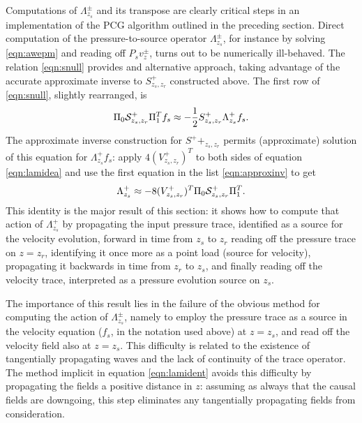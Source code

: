 Computations of $\Lambda^{\pm}_{z_s}$ and its transpose are clearly critical steps in an
implementation of the PCG algorithm outlined in the preceding section.
Direct computation of the pressure-to-source operator $\Lambda^{\pm}_{z_s}$, for instance by solving
\ref{eqn:awepm} and reading off $P_sv^{\pm}_{z}$, turns out to be
numerically ill-behaved. The relation \ref{eqn:snull} provides and
alternative approach, taking advantage of the accurate approximate
inverse to $S^+_{z_s,z_r}$ constructed above. The first row of
\ref{eqn:snull}, slightly rearranged, is
\begin{equation}
  \label{eqn:lamidea}
  \Pi_0{\cal S}^+_{z_s,z_r}\Pi_1^T f_s \approx  -\frac{1}{2} S^+_{z_s,z_r}\Lambda^+_{z_s}f_s.
\end{equation}
The approximate inverse construction for $S^++_{z_s,z_r}$ permits (approximate)
solution of this equation for $\Lambda^+_{z_s}f_s$: apply
$4(V^{+}_{z_s,z_r})^T$ to both sides of equation \ref{eqn:lamidea} and
use the first equation in the list \ref{eqn:approxinv} to get
\begin{equation}
  \label{eqn:lamident}
  \Lambda^+_{z_s} \approx -8(V^{+}_{z_s,z_r})^T\Pi_0 {\cal S}^+_{z_s,z_r}\Pi_1^T.
\end{equation}
This identity is the major result of this section: it shows how
to compute that action of $\Lambda^+_{z_s}$ by propagating the input
pressure trace, identified as a source for the velocity evolution,
forward in time from $z_s$ to $z_r$
reading off the pressure trace on $z=z_r$, identifying it once more as
a point load (source for velocity), propagating it backwards in time from $z_r$ to
$z_s$, and finally reading off the velocity trace, interpreted as a
pressure evolution source on $z_s$. 

The importance of this result lies in the failure of the obvious
method for computing the action of $\Lambda^{\pm}_{z_s}$, namely to
employ the pressure trace as a source in the velocity equation ($f_s$,
in the notation used above) at $z=z_s$, and read off the velocity
field also at $z=z_s$. This difficulty is related to the existence of
tangentially propagating waves and the lack of continuity of the trace
operator. The method implicit in equation \ref{eqn:lamident} avoids
this difficulty by propagating the fields a positive distance in $z$:
assuming as always that the causal fields are downgoing, this step
eliminates any tangentially propagating fields from consideration.

